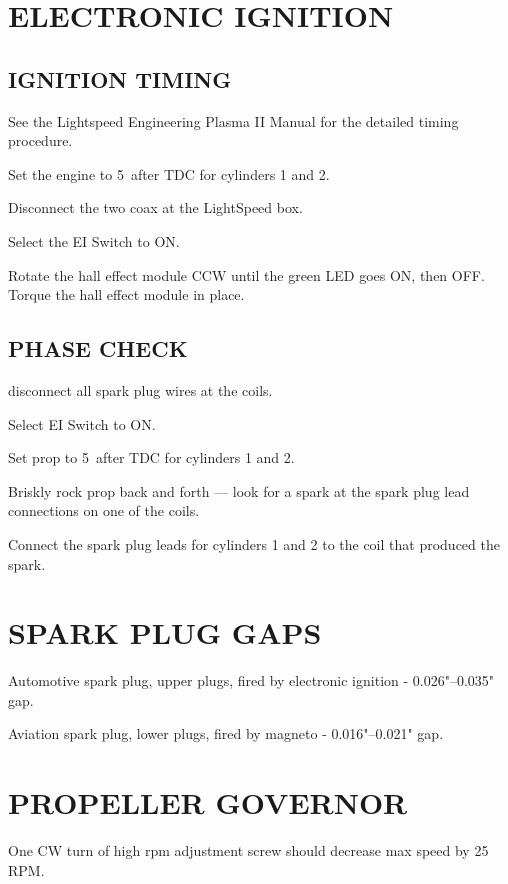 \section{ELECTRONIC IGNITION}
\subsection{IGNITION TIMING} 
\begin{enumerate*}
	\item See the Lightspeed Engineering Plasma II Manual for the detailed timing procedure. 
	\item Set the engine to 5\textdegree ~after TDC for cylinders 1 and 2.
	\item Disconnect the two coax at the LightSpeed box.
	\item Select the EI Switch to ON.
	\item Rotate the hall effect module CCW until the green LED goes ON, then OFF.  Torque the hall effect module in place.
\end{enumerate*}
  \subsection{PHASE CHECK} 
  \begin{enumerate*}
  	\item disconnect all spark plug wires at the coils.  
  	\item Select EI Switch to ON.  
  	\item Set prop to 5\textdegree ~after TDC for cylinders 1 and 2.  
  	\item Briskly rock prop back and forth --- look for a spark at the spark plug lead connections on one of the coils.  
  	\item Connect the spark plug leads for cylinders 1 and 2 to the coil that produced the spark.
\end{enumerate*}

\section{SPARK PLUG GAPS}
Automotive spark plug, upper plugs, fired by electronic ignition - 0.026"--0.035" gap.

Aviation spark plug, lower plugs, fired by magneto - 0.016"--0.021" gap.

\section{PROPELLER GOVERNOR}
One CW turn of high rpm adjustment screw should decrease max speed by 25 RPM. 

